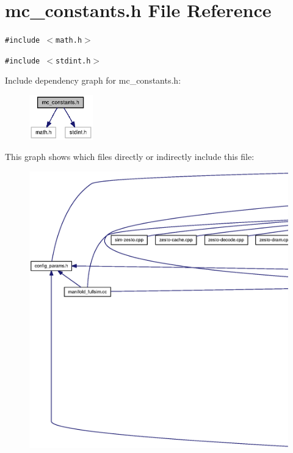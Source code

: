 \section{mc\_\-constants.h File Reference}
\label{mc__constants_8h}
{\tt \#include $<$math.h$>$}\par
{\tt \#include $<$stdint.h$>$}\par


Include dependency graph for mc\_\-constants.h:\nopagebreak
\begin{figure}[H]
\begin{center}
\leavevmode
\includegraphics[width=78pt]{mc__constants_8h__incl}
\end{center}
\end{figure}


This graph shows which files directly or indirectly include this file:\nopagebreak
\begin{figure}[H]
\begin{center}
\leavevmode
\includegraphics[width=420pt]{mc__constants_8h__dep__incl}
\end{center}
\end{figure}
